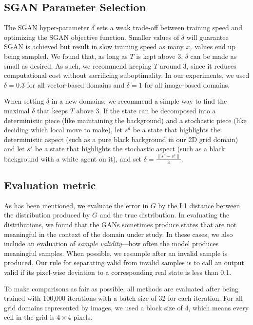 \documentclass[letterpaper]{article} %
\begin{document}
\subsection{SGAN Parameter Selection}

The SGAN hyper-parameter $\delta$ sets a weak trade-off between training speed and optimizing the SGAN objective function. Smaller values of $\delta$ will guarantee SGAN is achieved but result in slow training speed as many $x_\tau$ values end up being sampled. We found that, as long as $T$ is kept above $3$, $\delta$ can be made as small as desired. As such, we recommend keeping $T$ around $3$, since it reduces computational cost without sacrificing suboptimality. In our experiments, we used $\delta=0.3$ for all vector-based domains and $\delta=1$ for all image-based domains. 

When setting $\delta$ in a new domains, we recommend a simple way to find the maximal $\delta$ that keeps $T$ above $3$. If the state can be decomposed into a deterministic piece (like maintaining the background) and a stochastic piece (like deciding which local move to make), let $s^d$ be a state that highlights the deterministic aspect (such as a pure black background in our 2D grid domain) and let $s^s$ be a state that highlights the stochastic aspect (such as a black background with a white agent on it), and set $\delta=\frac{\|s^d-s^s\|}{3}$.

\subsection{Evaluation metric}

As has been mentioned, we evaluate the error in $G$ by the L1 distance between the distribution produced by $G$ and the true distribution.  In evaluating the distributions, we found that the GANs sometimes produce states that are not meaningful in the context of the domain under study. In these cases, we also include an evaluation of \emph{sample validity}---how often the model produces meaningful samples. When possible, we resample after an invalid sample is produced. Our rule for separating valid from invalid samples is to call an output valid if its pixel-wise deviation to a corresponding real state is less than 0.1. 

To make comparisons as fair as possible, all methods are evaluated after being trained with 100,000 iterations with a batch size of 32 for each iteration. For all grid domains represented by images, we used a block size of 4, which means every cell in the grid is $4\times4$ pixels.
\end{document}
